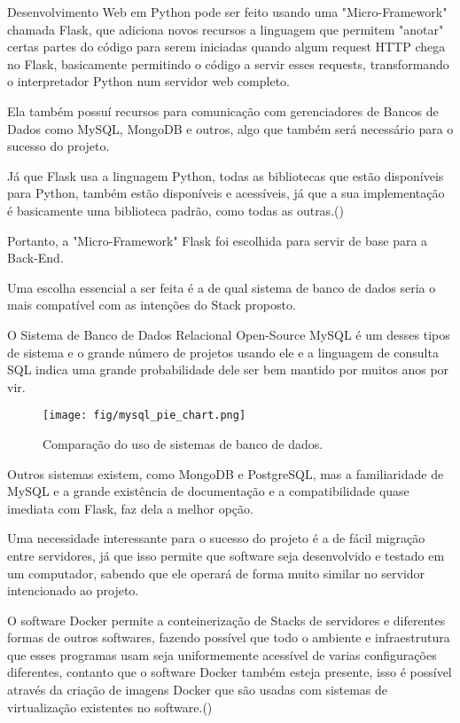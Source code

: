 Desenvolvimento Web em Python pode ser feito usando uma "Micro-Framework" chamada Flask, que adiciona novos recursos a linguagem que permitem "anotar" certas partes do código para serem iniciadas quando algum request HTTP chega no Flask, basicamente permitindo o código a servir esses requests, transformando o interpretador Python num servidor web completo.

Ela também possuí recursos para comunicação com gerenciadores de Bancos de Dados como MySQL, MongoDB e outros, algo que também será necessário para o sucesso do projeto.

Já que Flask usa a linguagem Python, todas as bibliotecas que estão disponíveis para Python, também estão disponíveis e acessíveis, já que a sua implementação é basicamente uma biblioteca padrão, como todas as outras.(\citealt{flask_website})

Portanto, a "Micro-Framework" Flask foi escolhida para servir de base para a Back-End.

Uma escolha essencial a ser feita é a de qual sistema de banco de dados seria o mais compatível com as intenções do Stack proposto.

O Sistema de Banco de Dados Relacional Open-Source MySQL é um desses tipos de sistema e o grande número de projetos usando ele e a linguagem de consulta SQL indica uma grande probabilidade dele ser bem mantido por muitos anos por vir.\citealt{mysql_manual}

\begin{figure}[!ht]
\begin{center}
\setcaptionmargin{1cm}
\texttt{[image: fig/mysql\_pie\_chart.png]}
\caption[Comparação do uso de sistemas de banco de dados.]{Comparação do uso de sistemas de banco de dados.} 
\label{mysql_pie_chart}
\end{center}
\end{figure}

Outros sistemas existem, como MongoDB e PostgreSQL, mas a familiaridade de MySQL e a grande existência de documentação e a compatibilidade quase imediata com Flask, faz dela a melhor opção. 

Uma necessidade interessante para o sucesso do projeto é a de fácil migração entre servidores, já que isso permite que software seja desenvolvido e testado em um computador, sabendo que ele operará de forma muito similar no servidor intencionado ao projeto.

O software Docker permite a conteinerização de Stacks de servidores e diferentes formas de outros softwares, fazendo possível que todo o ambiente e infraestrutura que esses programas usam seja uniformemente acessível de varias configurações diferentes, contanto que o software Docker também esteja presente, isso é possível através da criação de imagens Docker que são usadas com sistemas de virtualização existentes no software.(\citealt{docker_manual})

